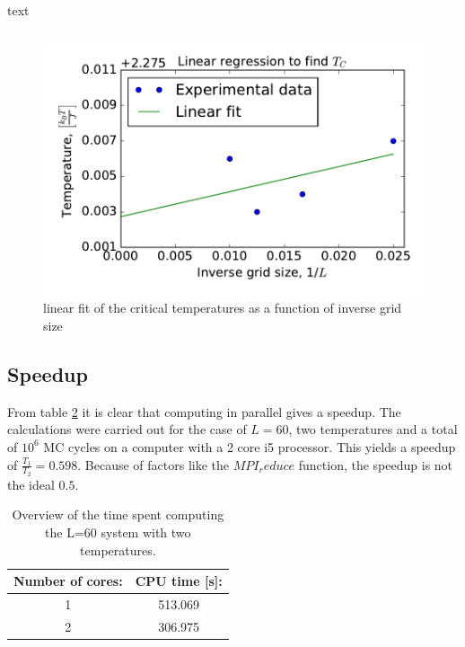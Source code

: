 \begin{table}[H]
	\caption{text}
	\label{tab: T_C}
	\begin{tabular}{cccccc}
		
	\end{tabular}
\end{table}


\begin{figure}[H]
	\centering
	\includegraphics[width=0.7\linewidth]{../results/4e/linfit}
	\caption{linear fit of the critical temperatures as a function of inverse grid size}
	\label{fig:linfit}
\end{figure}




\subsection{Speedup}
From table \ref{tab:speedy} it is clear that computing in parallel gives a speedup. The calculations were carried out for  the case of $ L=60 $, two temperatures and a total of $ 10^6 $ MC cycles on a computer with a 2 core i5 processor. This yields a speedup of $ \frac{T_1}{T_2} = 0.598$.  Because of factors like the $MPI_reduce$ function, the speedup is not the ideal $ 0.5 $. 

\begin{table}[H]\caption{Overview of the time spent computing the L=60 system with two temperatures.} \label{tab:speedy}
	\begin{tabular}{cc}
		Number of cores:& CPU time [s]: \\ \hline
		1 & 513.069\\
		2 & 306.975\\
	\end{tabular}
\end{table}
